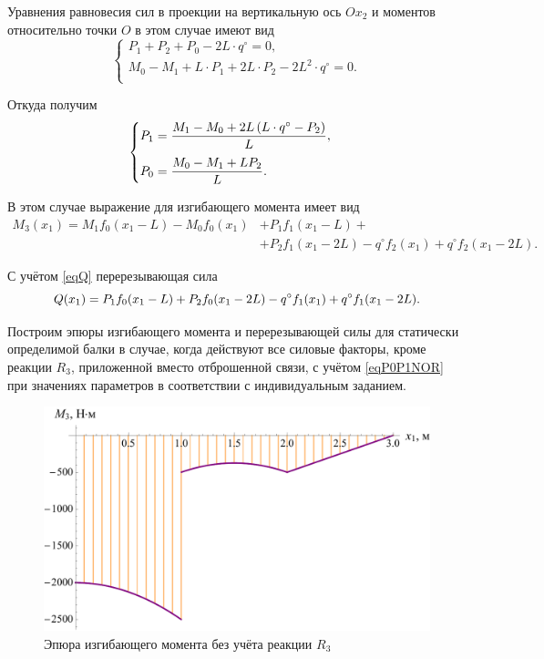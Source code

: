 \documentclass[12pt, a4paper]{article}
\begin{document}
	Уравнения равновесия сил в проекции на вертикальную ось $Ox_2$ и моментов относительно точки $O$ в этом случае имеют вид
	\vspace{-0.5em}
	\begin{equation*}
		\begin{cases}
			P_1 + P_2 + P_0 - 2L \cdot q^{\circ} = 0, \\
			M_0 - M_1 + L \cdot P_1 + 2L \cdot P_2 - 2 L^2 \cdot q^{\circ} = 0. \\
		\end{cases}
	\end{equation*}
	
	Откуда получим
	\begin{equation}
		\begin{cases} \vspace{0.75em}
			P_1 = \dfrac{ M_1 - M_0 + 2 L \left( L \cdot q^{\circ} - P_2 \right)}{L}, \\ 
			P_0 = \dfrac{M_0 - M_1 + L P_2}{L}. \\
		\end{cases}
		\label{eqP0P1NOR}
	\end{equation}
	
	В этом случае выражение для изгибающего момента имеет вид
	\begin{equation}
		\begin{split}
			M_3(x_1) = M_1 f_0(x_1 - L) - M_0 f_0(x_1) & + P_1 f_1(x_1 - L) + \\ & + P_2 f_1(x_1 - 2L) - q^{\circ} f_2(x_1) + q^{\circ} f_2(x_1 - 2L).
		\end{split}
		\label{eqM3NOR}
	\end{equation}
	
	С учётом \eqref{eqQ} перерезывающая сила
	\begin{equation}
		Q(x_1) = P_1 f_0(x_1 - L) + P_2 f_0(x_1 - 2L) - q^{\circ} f_1(x_1) + q^{\circ} f_1(x_1 - 2L).\\
		\label{eqQNOR}
	\end{equation}
	
	Построим эпюры изгибающего момента и перерезывающей силы для статически определимой балки в случае, когда действуют все силовые факторы, кроме реакции $R_3$, приложенной вместо отброшенной связи, с учётом \eqref{eqP0P1NOR} при  значениях параметров в соответствии с индивидуальным заданием.
	
	\newpage
	
	\begin{figure}[!h]
		\centering
		\includegraphics[width=0.7\linewidth]{plot-8}
		\caption{Эпюра изгибающего момента без учёта реакции $R_3$}
	\end{figure} 
	
\end{document}
